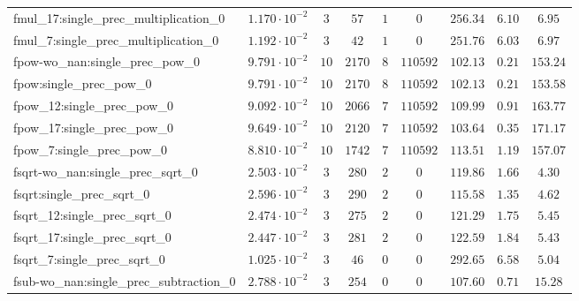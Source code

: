 \begin{tabular}{|l|c|c|c|c|c|c|c|c|}
fmul\_17:single\_prec\_multiplication\_0       & $ 1.170 \cdot 10^{-2} $ & $ 3      $ & $ 57    $ & $ 1   $ & $ 0      $ & $ 256.34      $ & $ 6.10    $ & $ 6.95    $ \\
fmul\_7:single\_prec\_multiplication\_0        & $ 1.192 \cdot 10^{-2} $ & $ 3      $ & $ 42    $ & $ 1   $ & $ 0      $ & $ 251.76      $ & $ 6.03    $ & $ 6.97    $ \\
fpow-wo\_nan:single\_prec\_pow\_0              & $ 9.791 \cdot 10^{-2} $ & $ 10     $ & $ 2170  $ & $ 8   $ & $ 110592 $ & $ 102.13      $ & $ 0.21    $ & $ 153.24  $ \\
fpow:single\_prec\_pow\_0                      & $ 9.791 \cdot 10^{-2} $ & $ 10     $ & $ 2170  $ & $ 8   $ & $ 110592 $ & $ 102.13      $ & $ 0.21    $ & $ 153.58  $ \\
fpow\_12:single\_prec\_pow\_0                  & $ 9.092 \cdot 10^{-2} $ & $ 10     $ & $ 2066  $ & $ 7   $ & $ 110592 $ & $ 109.99      $ & $ 0.91    $ & $ 163.77  $ \\
fpow\_17:single\_prec\_pow\_0                  & $ 9.649 \cdot 10^{-2} $ & $ 10     $ & $ 2120  $ & $ 7   $ & $ 110592 $ & $ 103.64      $ & $ 0.35    $ & $ 171.17  $ \\
fpow\_7:single\_prec\_pow\_0                   & $ 8.810 \cdot 10^{-2} $ & $ 10     $ & $ 1742  $ & $ 7   $ & $ 110592 $ & $ 113.51      $ & $ 1.19    $ & $ 157.07  $ \\
fsqrt-wo\_nan:single\_prec\_sqrt\_0            & $ 2.503 \cdot 10^{-2} $ & $ 3      $ & $ 280   $ & $ 2   $ & $ 0      $ & $ 119.86      $ & $ 1.66    $ & $ 4.30    $ \\
fsqrt:single\_prec\_sqrt\_0                    & $ 2.596 \cdot 10^{-2} $ & $ 3      $ & $ 290   $ & $ 2   $ & $ 0      $ & $ 115.58      $ & $ 1.35    $ & $ 4.62    $ \\
fsqrt\_12:single\_prec\_sqrt\_0                & $ 2.474 \cdot 10^{-2} $ & $ 3      $ & $ 275   $ & $ 2   $ & $ 0      $ & $ 121.29      $ & $ 1.75    $ & $ 5.45    $ \\
fsqrt\_17:single\_prec\_sqrt\_0                & $ 2.447 \cdot 10^{-2} $ & $ 3      $ & $ 281   $ & $ 2   $ & $ 0      $ & $ 122.59      $ & $ 1.84    $ & $ 5.43    $ \\
fsqrt\_7:single\_prec\_sqrt\_0                 & $ 1.025 \cdot 10^{-2} $ & $ 3      $ & $ 46    $ & $ 0   $ & $ 0      $ & $ 292.65      $ & $ 6.58    $ & $ 5.04    $ \\
fsub-wo\_nan:single\_prec\_subtraction\_0      & $ 2.788 \cdot 10^{-2} $ & $ 3      $ & $ 254   $ & $ 0   $ & $ 0      $ & $ 107.60      $ & $ 0.71    $ & $ 15.28   $ \\

\end{tabular}

